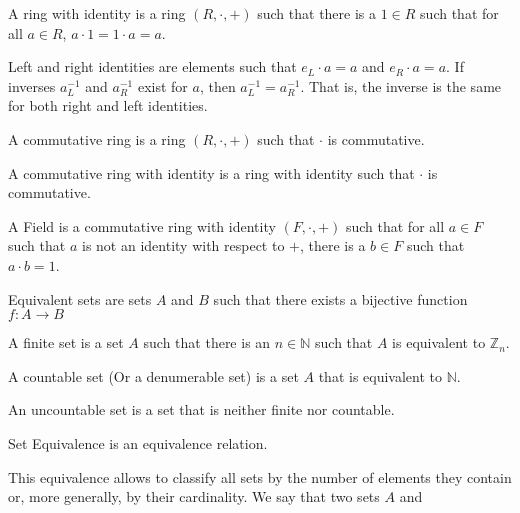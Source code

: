     \begin{definition}
        A ring with identity is a ring $(R,\cdot,+)$
        such that there is a ${1}\in{R}$ such that for
        all ${a}\in{R}$, ${a}\cdot{1}={1}\cdot{a}=a$.
    \end{definition}
    Left and right identities are elements such that ${e_{L}}\cdot{a}=a$
    and ${e_{R}}\cdot{a}=a$. If inverses $a_{L}^{-1}$ and $a_{R}^{-1}$
    exist for $a$, then $a_{L}^{-1}=a_{R}^{-1}$. That is, the inverse
    is the same for both right and left identities.
    \begin{definition}
        A commutative ring is a ring $(R,\cdot,+)$ such that
        $\cdot$ is commutative.
    \end{definition}
    \begin{definition}
        A commutative ring with identity is a ring with identity such
        that $\cdot$ is commutative.
    \end{definition}
    \begin{definition}
        A Field is a commutative ring with identity $(F,\cdot,+)$ such
        that for all ${a}\in{F}$ such that $a$ is not an identity with
        respect to $+$, there is a $b\in{F}$ such that ${a}\cdot{b}=1$.
    \end{definition}
    \begin{definition}
        Equivalent sets are sets $A$ and $B$ such that there exists a
        bijective function $f:{A}\rightarrow{B}$
    \end{definition}
    \begin{definition}
        A finite set is a set $A$ such that there is an
        ${n}\in{\mathbb{N}}$ such that $A$ is equivalent to
        $\mathbb{Z}_{n}$.
    \end{definition}
    \begin{definition}
        A countable set (Or a denumerable set) is a set $A$ that is
        equivalent to $\mathbb{N}$.
    \end{definition}
    \begin{definition}
        An uncountable set is a set that is neither finite nor countable.
    \end{definition}
    \begin{theorem}
        Set Equivalence is an equivalence relation.
    \end{theorem}
    This equivalence allows to classify all sets by the
    number of elements they contain or, more generally,
    by their cardinality. We say that two sets $A$ and
